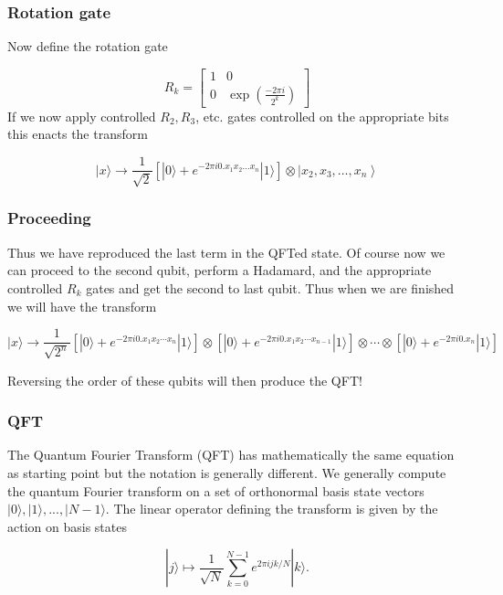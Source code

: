 \documentclass{beamer}
\begin{document}
\begin{frame}
\frametitle{Rotation gate}

Now define the rotation gate

\[
R_{k}=\left[\begin{array}{cc}
1 & 0  \tag{30}\\
0 & \exp \left(\frac{-2 \pi i}{2^{k}}\right)
\end{array}\right]
\]
If we now apply controlled $R_{2}, R_{3}$, etc. gates controlled on
the appropriate bits this enacts the transform

\begin{equation*}
|x\rangle \rightarrow \frac{1}{\sqrt{2}}\left[|0\rangle+e^{-2 \pi i 0 . x_{1} x_{2} \ldots x_{n}}|1\rangle\right] \otimes\left|x_{2}, x_{3}, \ldots, x_{n}\right\rangle 
\end{equation*}
\end{frame}

\begin{frame}
\frametitle{Proceeding}

Thus we have reproduced the last term in the QFTed state. Of course
now we can proceed to the second qubit, perform a Hadamard, and the
appropriate controlled $R_{k}$ gates and get the second to last
qubit. Thus when we are finished we will have the transform

\begin{equation*}
|x\rangle \rightarrow \frac{1}{\sqrt{2^{n}}}\left[|0\rangle+e^{-2 \pi i 0 . x_{1} x_{2} \cdots x_{n}}|1\rangle\right] \otimes\left[|0\rangle+e^{-2 \pi i 0 . x_{1} x_{2} \cdots x_{n-1}}|1\rangle\right] \otimes \cdots \otimes\left[|0\rangle+e^{-2 \pi i 0 . x_{n}}|1\rangle\right]
\end{equation*}

Reversing the order of these qubits will then produce the QFT!


\end{frame}

\begin{frame}
\frametitle{QFT}

The Quantum Fourier Transform (QFT) has mathematically the same equation as starting point
but the notation is generally different. We generally compute the
quantum Fourier transform on a set of orthonormal basis state vectors
\(|0\rangle, |1\rangle, ..., |N-1\rangle\). The linear operator defining
the transform is given by the action on basis states

\[
|j\rangle \mapsto \frac{1}{\sqrt{N}} \sum_{k=0}^{N-1} e^{2\pi ijk/N}|k\rangle.
\]
\end{frame}
\end{document}
